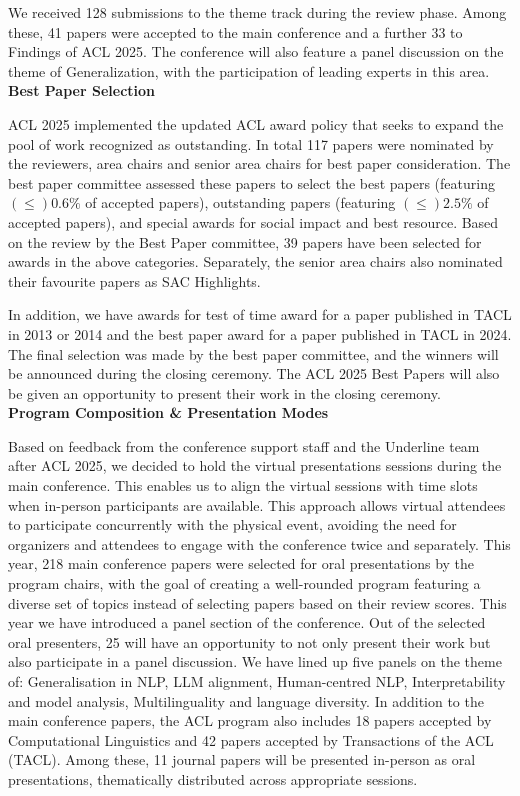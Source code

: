 We received 128 submissions to the theme track during the review phase. Among these, 41 papers were accepted to the main conference and a further 33 to Findings of ACL 2025. The conference will also feature a panel discussion on the theme of Generalization, with the participation of leading experts in this area.\\

\textbf{Best Paper Selection}

ACL 2025 implemented the updated ACL award policy that seeks to expand the pool
of work recognized as outstanding. In total 117 papers were nominated by the reviewers, area chairs and senior area chairs for best paper consideration. The best paper committee assessed these papers to select the best papers (featuring $(\leq)0.6\%$ of accepted papers), outstanding papers (featuring $(\leq)2.5\%$ of accepted papers), and special awards for social impact and best resource.  Based on the review by the Best Paper committee, 39 papers have been selected for awards in the above categories. Separately, the senior area chairs also nominated their favourite papers as SAC Highlights.

In addition, we have awards for test of time award for a paper published in TACL in 2013 or 2014 and the best paper award for a paper published in TACL in 2024. The final selection was made by the best paper committee, and the winners will be announced during the closing ceremony. The ACL 2025 Best Papers will also be given an opportunity to present their work in the closing ceremony.\\

\textbf{Program Composition \& Presentation Modes}

Based on feedback from the conference support staff and the Underline team after ACL 2025, we decided to hold the virtual presentations sessions during the main conference. This enables us to align the virtual sessions with time slots when in-person participants are available. This approach allows virtual attendees to participate concurrently with the physical event, avoiding the need for organizers and attendees to engage with the conference twice and separately.
This year, 218 main conference papers were selected for oral presentations by the program chairs, with the goal of creating a well-rounded program featuring a diverse set of topics instead of selecting papers based on their review scores. This year we have introduced a panel section of the conference. Out of the selected oral presenters, 25 will have an opportunity to not only present their work but also participate in a panel discussion. We have lined up five panels on the theme of: Generalisation in NLP, LLM alignment, Human-centred NLP, Interpretability and model analysis, Multilinguality and language diversity.
In addition to the main conference papers, the ACL program also includes 18 papers accepted by Computational Linguistics and 42 papers accepted by Transactions of the ACL (TACL). Among these, 11 journal papers will be presented in-person as oral presentations, thematically distributed across appropriate sessions. 

